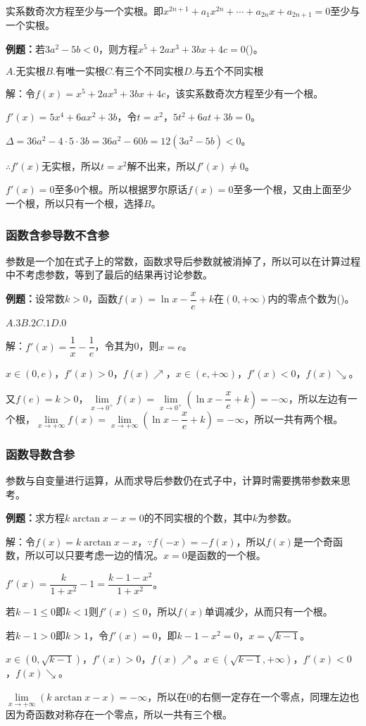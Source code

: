 \documentclass[UTF8, 12pt]{ctexart}
\begin{document}
实系数奇次方程至少与一个实根。即$x^{2n+1}+a_1x^{2n}+\cdots+a_{2n}x+a_{2n+1}=0$至少与一个实根。

\textbf{例题：}若$3a^2-5b<0$，则方程$x^5+2ax^3+3bx+4c=0$()。

$A.\text{无实根}$\qquad$B.\text{有唯一实根}$\qquad$C.\text{有三个不同实根}$\qquad$D.\text{与五个不同实根}$

解：令$f(x)=x^5+2ax^3+3bx+4c$，该实系数奇次方程至少有一个根。

$f'(x)=5x^4+6ax^2+3b$，令$t=x^2$，$5t^2+6at+3b=0$。

$\Delta=36a^2-4\cdot5\cdot3b=36a^2-60b=12(3a^2-5b)<0$。

$\therefore f'(x)$无实根，所以$t=x^2$解不出来，所以$f'(x)\neq0$。

$f'(x)=0$至多0个根。所以根据罗尔原话$f(x)=0$至多一个根，又由上面至少一个根，所以只有一个根，选择$B$。

\subsubsection{函数含参导数不含参}

参数是一个加在式子上的常数，函数求导后参数就被消掉了，所以可以在计算过程中不考虑参数，等到了最后的结果再讨论参数。

\textbf{例题：}设常数$k>0$，函数$f(x)=\ln x-\dfrac{x}{e}+k$在$(0,+\infty)$内的零点个数为()。

$A.3$\qquad$B.2$\qquad$C.1$\qquad$D.0$

解：$f'(x)=\dfrac{1}{x}-\dfrac{1}{e}$，令其为0，则$x=e$。

$x\in(0,e)$，$f'(x)>0$，$f(x)\nearrow$，$x\in(e,+\infty)$，$f'(x)<0$，$f(x)\searrow$。

又$f(e)=k>0$，$\lim\limits_{x\to0^+}f(x)=\lim\limits_{x\to0^+}(\ln x-\dfrac{x}{e}+k)=-\infty$，所以左边有一个根，$\lim\limits_{x\to+\infty}f(x)=\lim\limits_{x\to+\infty}(\ln x-\dfrac{x}{e}+k)=-\infty$，所以一共有两个根。

\subsubsection{函数导数含参}

参数与自变量进行运算，从而求导后参数仍在式子中，计算时需要携带参数来思考。

\textbf{例题：}求方程$k\arctan x-x=0$的不同实根的个数，其中$k$为参数。

解：令$f(x)=k\arctan x-x$$，\because f(-x)=-f(x)$，所以$f(x)$是一个奇函数，所以可以只要考虑一边的情况。$x=0$是函数的一个根。

$f'(x)=\dfrac{k}{1+x^2}-1=\dfrac{k-1-x^2}{1+x^2}$。

若$k-1\leqslant0$即$k<1$则$f'(x)\leqslant0$，所以$f(x)$单调减少，从而只有一个根。

若$k-1>0$即$k>1$，令$f'(x)=0$，即$k-1-x^2=0$，$x=\sqrt{k-1}$。

$x\in(0,\sqrt{k-1})$，$f'(x)>0$，$f(x)\nearrow$。$x\in(\sqrt{k-1},+\infty)$，$f'(x)<0$，$f(x)\searrow$。

$\lim\limits_{x\to+\infty}(k\arctan x-x)=-\infty$，所以在0的右侧一定存在一个零点，同理左边也因为奇函数对称存在一个零点，所以一共有三个根。
\end{document}
